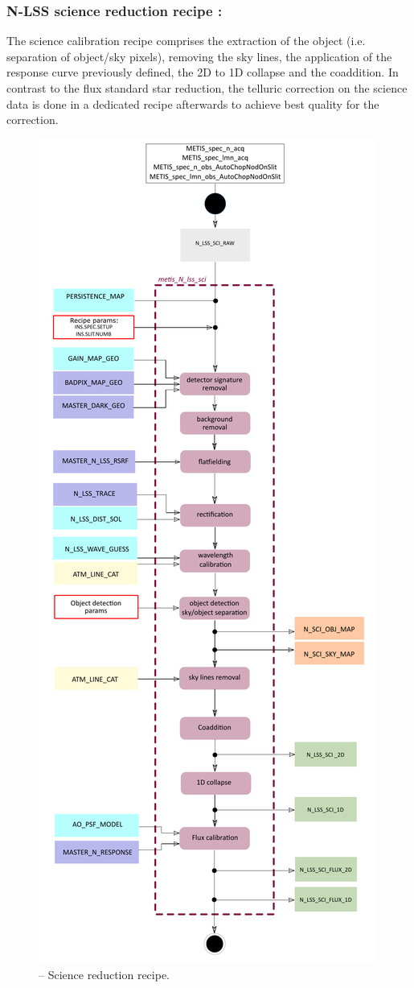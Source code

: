 \subsubsection{N-LSS science reduction recipe :}\label{rec:lssnsci}
The science calibration recipe comprises the extraction of the object (i.e. separation of object/sky pixels), removing the sky lines, the application of the response curve previously defined, the 2D to 1D collapse and the coaddition. In contrast to the flux standard star reduction, the telluric correction on the science data is done in a dedicated recipe afterwards to achieve best quality for the correction.
\begin{figure}[ht]
  \centering
  \includegraphics[width=0.38\textheight]{figures/metis_N_lss_sci_v0.74.pdf}
  \caption[Recipe: ]{ --
    Science reduction recipe.}
  \label{Fig:rec_N_lss_sci}
\end{figure}
